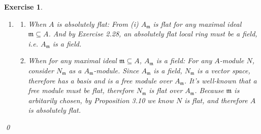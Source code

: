 \documentclass{article}
\theoremstyle{breakstyle}
\newtheorem{exercise}{Exercise}
\begin{document}
\begin{exercise}
\begin{enumerate}[label=({\roman*})]
            Now by \emph{Proposition 3.3}, the $S^{-1}\_$ functor is exact, and
            $$
            0\longrightarrow S^{-1}\left( M'\otimes _{A}N \right) \xrightarrow[]{S^{-1}\left( f\mid _{A}\otimes 1 \right) } S^{-1}\left( M\otimes _{A}N \right) 
            $$
            is an exact $S^{-1}A$ sequence.
            Moreover, by \emph{Proposition 3.7} such sequence is isomorphic to
            $$
            0\longrightarrow S^{-1}M\otimes _{S^{-1}A}S^{-1}N\xrightarrow[]{f\otimes 1} S^{-1}M\otimes _{S^{-1}A}S^{-1}N
            $$
            and we get its exactness.
        \item 
            \begin{enumerate}[label=({\alph*})]
                \item When $A$ is absolutely flat:
                    From \emph{(i)} $A_{\mathfrak{m}}$ is flat for any maximal ideal $\mathfrak{m}\subseteq A$.
                    And by \emph{Exercise 2.28}, an absolutely flat local ring must be a field, i.e. $A_{\mathfrak{m}}$ is a field.
                \item When for any maximal ideal $\mathfrak{m}\subseteq A$, $A_{\mathfrak{m}}$ is a field:
                    For any $A$-module $N$, consider $N_{\mathfrak{m}}$ as a $A_{\mathfrak{m}}$-module.
                    Since $A_{\mathfrak{m}}$ is a field, $N_{\mathfrak{m}}$ is a vector space, therefore has a basis and is a free module over $A_{\mathfrak{m}}$.
                    It's well-known that a free module must be flat, therefore $N_{\mathfrak{m}}$ is flat over $A_{\mathfrak{m}}$.
                    Because $\mathfrak{m}$ is arbitarily chosen, by \emph{Proposition 3.10} we know $N$ is flat, and therefore $A$ is absolutely flat.
            \end{enumerate}
    \end{enumerate}
    \qed
\end{exercise}
\end{document}
